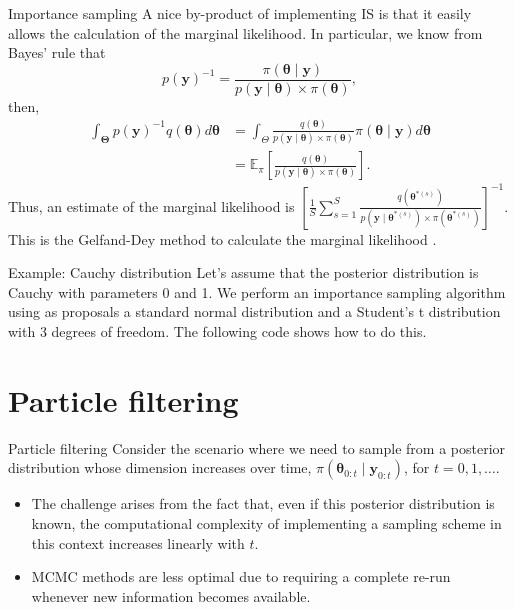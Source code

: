 \documentclass[12pt, compress]{beamer}
\begin{document}
\begin{frame}{Importance sampling}
A nice by-product of implementing IS is that it easily allows the calculation of the marginal likelihood. In particular, we know from Bayes' rule that
$$p(\bm{y})^{-1}=\frac{\pi(\bm{\theta}\mid \bm{y})}{p(\bm{y}\mid \bm{\theta})\times \pi(\bm{\theta})},$$
then, 
\begin{align*}
	\int_{\bm{\Theta}}p(\bm{y})^{-1}q(\bm{\theta})d\bm{\theta}&=\int_{{\Theta}}\frac{q(\bm{\theta})}{p(\bm{y}\mid \bm{\theta})\times \pi(\bm{\theta})}\pi(\bm{\theta}\mid \bm{y})d\bm{\theta}\\
	&=\mathbb{E}_{\pi}\left[\frac{q(\bm{\theta})}{p(\bm{y}\mid \bm{\theta})\times \pi(\bm{\theta})}\right].
\end{align*}
Thus, an estimate of the marginal likelihood is $\left[\frac{1}{S}\sum_{s=1}^S\frac{q(\bm{\theta}^{*(s)})}{p(\bm{y}\mid \bm{\theta}^{*(s)})\times\pi(\bm{\theta}^{*(s)})}\right]^{-1}$. This is the Gelfand-Dey method to calculate the marginal likelihood \citep{gelfand1994bayesian}.
\end{frame}

\begin{frame}{Example: Cauchy distribution}
Let’s assume that the posterior distribution is Cauchy with parameters 0 and 1. We perform an importance sampling algorithm using as proposals a standard normal distribution and a Student’s t distribution with 3 degrees of freedom. The following code shows how to do this.
\end{frame}

\section{Particle filtering}

\begin{frame}{Particle filtering}
Consider the scenario where we need to sample from a posterior distribution whose dimension increases over time, $\pi(\bm{\theta}_{0:t}\mid \bm{y}_{0:t})$, for $t = 0, 1, \dots$. 
\begin{itemize}
	\item The challenge arises from the fact that, even if this posterior distribution is known, the computational complexity of implementing a sampling scheme in this context increases linearly with $t$.
	\item MCMC methods are less optimal due to requiring a complete re-run whenever new information becomes available.  
\end{itemize}
\end{frame}
\end{document}
